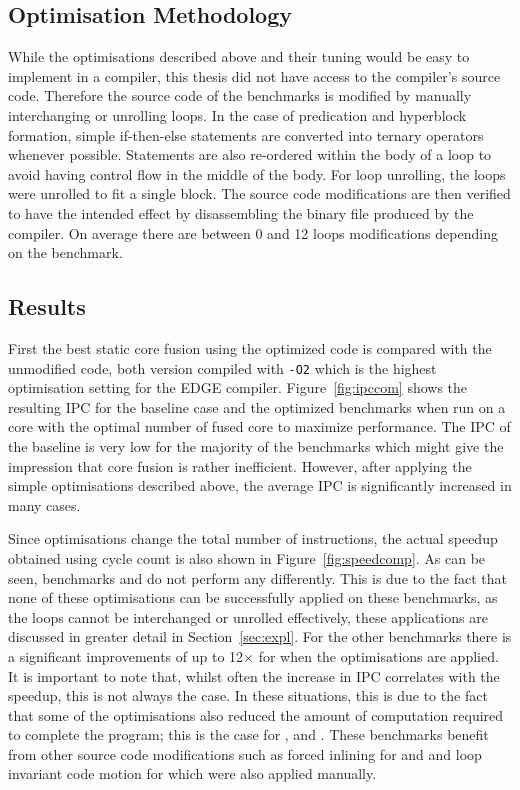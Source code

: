\subsection{Optimisation Methodology}
While the optimisations described above and their tuning would be easy to implement in a compiler, this thesis did not have access to the compiler's source code.
Therefore the source code of the benchmarks is modified by manually interchanging or unrolling loops.
In the case of predication and hyperblock formation, simple if-then-else statements are converted into ternary operators whenever possible.
Statements are also re-ordered within the body of a loop to avoid having control flow in the middle of the body.
For loop unrolling, the loops were unrolled to fit a single block.
The source code modifications are then verified to have the intended effect by disassembling the binary file produced by the compiler.
On average there are between 0 and 12 loops modifications depending on the benchmark.

\subsection{Results}
First the best static core fusion using the optimized code is compared with the unmodified code, both version compiled with \texttt{-O2} which is the highest optimisation setting for the EDGE compiler.
Figure~\ref{fig:ipccom} shows the resulting IPC for the baseline case and the optimized benchmarks when run on a core with the optimal number of fused core to maximize performance.
The IPC of the baseline is very low for the majority of the benchmarks which might give the impression that core fusion is rather inefficient.
However, after applying the simple optimisations described above, the average IPC is significantly increased in many cases.

Since optimisations change the total number of instructions, the actual speedup obtained using cycle count is also shown in Figure~\ref{fig:speedcomp}.
As can be seen, benchmarks  and  do not perform any differently.
This is due to the fact that none of these optimisations can be successfully applied on these benchmarks, as the loops cannot be interchanged or unrolled effectively, these applications are discussed in greater detail in Section~\ref{sec:expl}.
For the other benchmarks there is a significant improvements of up to 12$\times$ for  when the optimisations are applied.
It is important to note that, whilst often the increase in IPC correlates with the speedup, this is not always the case.
In these situations, this is due to the fact that some of the optimisations also reduced the amount of computation required to complete the program; this is the case for ,  and .
These benchmarks benefit from other source code modifications such as forced inlining for  and  and loop invariant code motion for  which were also applied manually.

